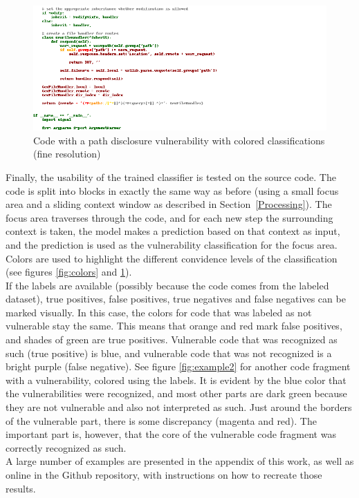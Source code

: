 \documentclass[
a4paper,
pagesize,
pdftex,
12pt,
twoside, %
BCOR=5mm, %
ngerman,
fleqn,
final,
]{scrartcl}
\begin{document}
	\begin{figure}[h]
		\centering
		\includegraphics[width=1\textwidth]{img/examplePathDisclosure.png}
		\caption{Code with a path disclosure vulnerability with colored classifications (fine resolution)}
		\label{fig:example}
	\end{figure}
	Finally, the usability of the trained classifier is tested on the source code. The code is split into blocks in exactly the same way as before (using a small focus area and a sliding context window as described in Section~\ref{Processing}). The focus area traverses through the code, and for each new step the surrounding context is taken, the model makes a prediction based on that context as input, and the prediction is used as the vulnerability classification for the focus area. Colors are used to highlight the different convidence levels of the classification (see figures \ref{fig:colors} and \ref{fig:example}).\\	
	If the labels are available (possibly because the code comes from the labeled dataset), true positives, false positives, true negatives and false negatives can be marked visually. In this case, the colors for code that was labeled as not vulnerable stay the same. This means that orange and red mark false positives, and shades of green are true positives. Vulnerable code that was recognized as such (true positive) is blue, and vulnerable code that was not recognized is a bright purple (false negative). See figure \ref{fig:example2} for another code fragment with a vulnerability, colored using the labels. It is evident by the blue color that the vulnerabilities were recognized, and most other parts are dark green because they are not vulnerable and also not interpreted as such. Just around the borders of the vulnerable part, there is some discrepancy (magenta and red). The important part is, however, that the core of the vulnerable code fragment was correctly recognized as such.\\
	A large number of examples are presented in the appendix of this work, as well as online in the Github repository, with instructions on how to recreate those results.
	
\end{document}
